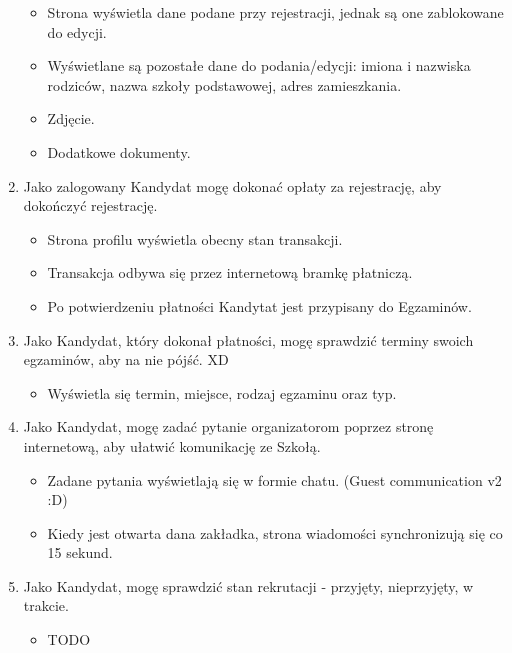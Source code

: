\documentclass{article}
\begin{document}
\begin{enumerate}
\begin{itemize}
        \item Strona wyświetla dane podane przy rejestracji, jednak są one zablokowane do edycji.
        \item Wyświetlane są pozostałe dane do podania/edycji: imiona i nazwiska rodziców, nazwa szkoły podstawowej, adres zamieszkania.
        \item Zdjęcie.
        \item Dodatkowe dokumenty.
        \end{itemize}
    \item Jako zalogowany Kandydat mogę dokonać opłaty za rejestrację, aby dokończyć rejestrację.
        \begin{itemize}
        \item Strona profilu wyświetla obecny stan transakcji.
        \item Transakcja odbywa się przez internetową bramkę płatniczą.
        \item Po potwierdzeniu płatności Kandytat jest przypisany do Egzaminów.
        \end{itemize}
    \item Jako Kandydat, który dokonał płatności, mogę sprawdzić terminy swoich egzaminów, aby na nie pójść. XD
        \begin{itemize}
        \item Wyświetla się termin, miejsce, rodzaj egzaminu oraz typ.
        \end{itemize}
    \item Jako Kandydat, mogę zadać pytanie organizatorom poprzez stronę internetową, aby ułatwić komunikację ze Szkołą.
        \begin{itemize}
        \item Zadane pytania wyświetlają się w formie chatu. (Guest communication v2 :D)
        \item Kiedy jest otwarta dana zakładka, strona wiadomości synchronizują się co 15 sekund.
        \end{itemize}
    \item Jako Kandydat, mogę sprawdzić stan rekrutacji - przyjęty, nieprzyjęty, w trakcie.
        \begin{itemize}
        \item TODO
        \end{itemize}
\end{enumerate}
\end{document}

